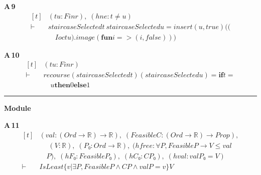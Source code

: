 \noindent\textbf{A\,9}\quad{}
{\footnotesize\[ \begin{aligned}[t]
&(\mathit{t} \mathit{u} : \mathit{Fin} \mathit{r}),\; (\mathit{hne} : \mathit{t} \neq \mathit{u})\\
\vdash\;&\mathit{staircaseSelected} \mathit{t} \ \mathit{staircaseSelected} \mathit{u} = \mathit{insert} (\mathit{u},\mathit{true}) ((\\
&\quad \mathit{Ioc} \mathit{t} \mathit{u}).\mathit{image} (\mathbf{fun} \mathit{i} => (\mathit{i},\mathit{false})))
\end{aligned} \]}

\noindent\textbf{A\,10}\quad{}
{\footnotesize\[ \begin{aligned}[t]
&(\mathit{t} \mathit{u} : \mathit{Fin} \mathit{r})\\
\vdash\;&\mathit{recourse} (\mathit{staircaseSelected} \mathit{t}) (\mathit{staircaseSelected} \mathit{u}) = \mathbf{if} \mathit{t}=\\
&\quad \mathit{u} \mathbf{then} 0 \mathbf{else} 1
\end{aligned} \]}

\vspace{4pt}\noindent\rule{\columnwidth}{0.4pt}\par\vspace{2pt}
\noindent\textbf{Module }\par\vspace{3pt}

\noindent\textbf{A\,11}\quad{}
{\footnotesize\[ \begin{aligned}[t]
&(\mathit{val} : (\mathit{Ord} \to \mathbb{R} ) \to \mathbb{R} ),\; (\mathit{Feasible} \mathit{C} : (\mathit{Ord} \to \mathbb{R} ) \to \mathit{Prop}),\\
&\quad \; (\mathit{V} : \mathbb{R} ),\; (\mathit{P₀} : \mathit{Ord} \to \mathbb{R} ),\; (\mathit{hfree} : \forall \mathit{P}, \mathit{Feasible} \mathit{P} \to \mathit{V} \leq \mathit{val}\\
&\quad \mathit{P}),\; (\mathit{hF₀} : \mathit{Feasible} \mathit{P₀}),\; (\mathit{hC₀} : \mathit{C} \mathit{P₀}),\; (\mathit{hval} : \mathit{val} \mathit{P₀} = \mathit{V})\\
\vdash\;&\mathit{IsLeast} \{ \mathit{v} | \exists \mathit{P}, \mathit{Feasible} \mathit{P} \wedge \mathit{C} \mathit{P} \wedge \mathit{val} \mathit{P} = \mathit{v}\} \mathit{V}
\end{aligned} \]}

